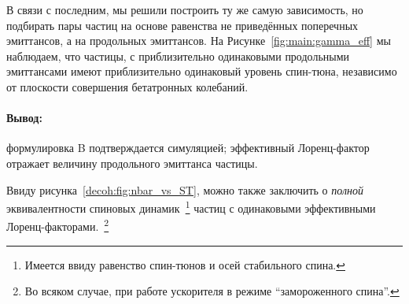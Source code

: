 В связи с последним, мы решили построить ту же самую зависимость, но подбирать пары частиц на основе равенства не приведённых поперечных эмиттансов, а на продольных эмиттансов. На Рисунке~\ref{fig:main:gamma_eff} мы наблюдаем, что частицы, с приблизительно одинаковыми продольными эмиттансами имеют приблизительно одинаковый уровень спин-тюна, независимо от плоскости совершения бетатронных колебаний.

\paragraph{Вывод:} формулировка B подтверждается симуляцией; эффективный Лоренц-фактор отражает величину продольного эмиттанса частицы.

Ввиду рисунка~\ref{decoh:fig:nbar_vs_ST}, можно также заключить о \emph{полной} эквивалентности спиновых динамик~\footnote{Имеется ввиду равенство спин-тюнов и осей стабильного спина.} частиц с одинаковыми эффективными Лоренц-факторами.~\footnote{Во всяком случае, при работе ускорителя в режиме ``замороженного спина''.}
